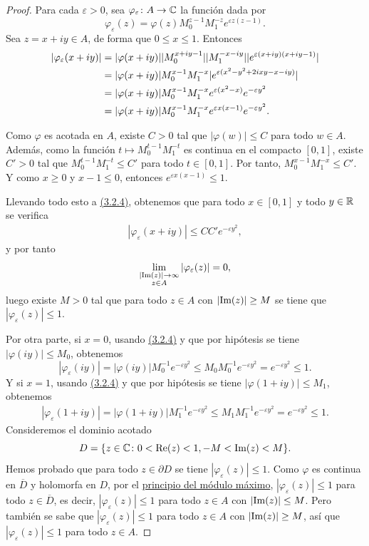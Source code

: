 \documentclass[a4paper, 12pt]{book}
\begin{document}
\begin{proof}
    Para cada $\varepsilon > 0$, sea $\varphi_\varepsilon \colon A \to \mathbb C$ la función dada por
    \[\varphi_\varepsilon(z) = \varphi(z)M_0^{z-1}M_1^{-z}e^{\varepsilon z(z-1)}.\]
    Sea $z = x+iy \in A$, de forma que $0 \leq x \leq 1$. Entonces
    \begin{align}\label{3.2.4}
    |\varphi_\varepsilon(x+iy)| &= |\varphi(x+iy)|| M_0^{x+iy-1}||M_1^{-x-iy}||e^{\varepsilon(x+iy)(x+iy-1)}| \notag \\
    &= |\varphi(x+iy)|M_0^{x-1}M_1^{-x}|e^{\varepsilon(x^2-y^2+2ixy-x-iy)}| \notag \\
    &= |\varphi(x+iy)|M_0^{x-1}M_1^{-x}e^{\varepsilon (x^2-x)}e^{-\varepsilon y^2} \notag \\
    &= |\varphi(x+iy)|M_0^{x-1}M_1^{-x}e^{\varepsilon x(x-1)}e^{-\varepsilon y^2}.
    \end{align} 

    Como $\varphi$ es acotada en $A$, existe $C > 0$ tal que $|\varphi(w)| \leq C$ para todo $w \in A$. Además, como la función $t \mapsto M_0^{t-1}M_1^{-t}$ es continua en el compacto $[0,1]$, existe $C'> 0$ tal que $M_0^{t-1}M_1^{-t} \leq C'$ para todo $t \in [0,1]$. Por tanto, $M_0^{x-1}M_1^{-x} \leq C'$. Y como $x \geq 0$ y $x-1 \leq 0$, entonces $e^{\varepsilon x(x-1)} \leq 1$. 
    
    Llevando todo esto a \hyperref[3.2.4]{(3.2.4)}, obtenemos que para todo $x \in [0,1]$ y todo $y \in \mathbb R$ se verifica
    \begin{align*}
        |\varphi_\varepsilon(x+iy)| \leq CC'e^{-\varepsilon y^2}, 
    \end{align*} 
    y por tanto
    \[\lim_{\substack{|\textup{Im}(z)| \to \infty \\ z \in A}} |\varphi_\varepsilon(z)| = 0,\]
    luego existe $M > 0$ tal que para todo $z \in A$ con $|\textup{Im}(z)| \geq M$ se tiene que $|\varphi_\varepsilon(z)| \leq 1$. 
    
    Por otra parte, si $x = 0$, usando \hyperref[3.2.4]{(3.2.4)} y que por hipótesis se tiene $|\varphi(iy)| \leq M_0$, obtenemos
    \[|\varphi_\varepsilon(iy)| = |\varphi(iy)|M_0^{-1}e^{-\varepsilon y^2} \leq M_0M_0^{-1}e^{-\varepsilon y^2} = e^{-\varepsilon y^2} \leq 1.\]
    Y si $x = 1$, usando \hyperref[3.2.4]{(3.2.4)} y que por hipótesis se tiene $|\varphi(1+iy)| \leq M_1$, obtenemos
    \begin{align*}
        |\varphi_\varepsilon(1+iy)| = |\varphi(1+iy)|M_1^{-1}e^{-\varepsilon y^2} \leq M_1M_1^{-1}e^{-\varepsilon y^2} = e^{-\varepsilon y^2} \leq 1.
    \end{align*}
    Consideremos el dominio acotado 
    \[D = \{z \in \mathbb C \colon 0 < \textup{Re}(z) < 1, -M < \textup{Im}(z) < M\}.\]
    Hemos probado que para todo $z \in \partial D$ se tiene $|\varphi_\varepsilon(z)| \leq 1$. Como $\varphi$ es continua en $\overline{D}$ y holomorfa en $D$, por el \hyperref[1.2.12]{principio del módulo máximo}, $|\varphi_\varepsilon(z)| \leq 1$ para todo $z \in \overline{D}$, es decir, $|\varphi_\varepsilon(z)| \leq 1$ para todo $z \in A$ con $|\textup{Im}(z)| \leq M$. Pero también se sabe que $|\varphi_\varepsilon(z)| \leq 1$ para todo $z \in A$ con $|\textup{Im}(z)| \geq M$, así que $|\varphi_\varepsilon(z)| \leq 1$ para todo $z \in A$.


\end{proof}
\end{document}
